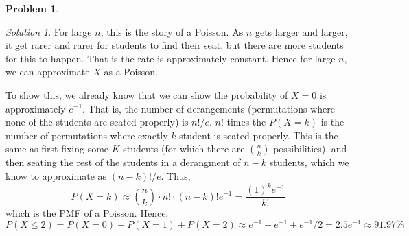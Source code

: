 \documentclass[11pt]{article}
\theoremstyle{definition}
\newtheorem{prob}[theo]{\color{Maroon} Problem}
\theoremstyle{remark}
\newtheorem*{soln}{\color{Maroon} Solution}
\begin{document}
\begin{prob}
\begin{enumerate}[label = (\alph*)]
    \begin{soln}
    For large $n$, this is the story of a Poisson. As $n$ gets larger and larger, it get rarer and rarer for students to find their seat, but there are more students for this to happen. That is the rate is approximately constant. Hence for large $n$, we can approximate $X$ as a Poisson. 
    
    To show this, we already know that we can show the probability of $X=0$ is approximately $e^{-1}$. That is, the number of derangements (permutations where none of the students are seated properly) is $n!/e$. $n!$ times the $P(X=k)$ is the number of permutations where exactly $k$ student is seated properly. This is the same as first fixing some $K$ students (for which there are $\binom{n}{k}$ possibilities), and then seating the rest of the students in a derangment of $n-k$ students, which we know to approximate as $(n-k)!/e$. Thus, $$P(X=k) \approx \binom{n}{k} \cdot n! \cdot (n-k)! e^{-1} = \frac{(1)^k e^{-1}}{k!} $$ which is the PMF of a Poisson. Hence, $$P(X \leq 2) = P(X=0)+P(X=1)+P(X=2) \approx e^{-1} + e^{-1} + e^{-1}/2 = 2.5 e^{-1} \approx 91.97\%$$
    \end{soln}
    
\end{enumerate}

\end{prob}

\pagebreak
\end{document}
